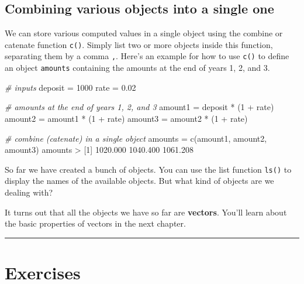 \documentclass[
]{book}
\newenvironment{Shaded}{\begin{snugshade}}{\end{snugshade}}
\newcommand{\CommentTok}[1]{\textcolor[rgb]{0.56,0.35,0.01}{\textit{#1}}}
\newcommand{\DecValTok}[1]{\textcolor[rgb]{0.00,0.00,0.81}{#1}}
\newcommand{\FloatTok}[1]{\textcolor[rgb]{0.00,0.00,0.81}{#1}}
\newcommand{\FunctionTok}[1]{\textcolor[rgb]{0.00,0.00,0.00}{#1}}
\newcommand{\NormalTok}[1]{#1}
\newcommand{\OtherTok}[1]{\textcolor[rgb]{0.56,0.35,0.01}{#1}}
\newcommand{\SpecialCharTok}[1]{\textcolor[rgb]{0.00,0.00,0.00}{#1}}
\begin{document}
\hypertarget{combining-various-objects-into-a-single-one}{%
\subsection{Combining various objects into a single one}\label{combining-various-objects-into-a-single-one}}

We can store various computed values in a single object using the combine or
catenate function \texttt{c()}. Simply list two or more objects inside this function,
separating them by a comma \texttt{,}. Here's an example for how to use \texttt{c()} to
define an object \texttt{amounts} containing the amounts at the end of years 1, 2,
and 3.

\begin{Shaded}
\begin{Highlighting}[]
\CommentTok{\# inputs}
\NormalTok{deposit }\OtherTok{=} \DecValTok{1000}
\NormalTok{rate }\OtherTok{=} \FloatTok{0.02}

\CommentTok{\# amounts at the end of years 1, 2, and 3}
\NormalTok{amount1 }\OtherTok{=}\NormalTok{ deposit }\SpecialCharTok{*}\NormalTok{ (}\DecValTok{1} \SpecialCharTok{+}\NormalTok{ rate)}
\NormalTok{amount2 }\OtherTok{=}\NormalTok{ amount1 }\SpecialCharTok{*}\NormalTok{ (}\DecValTok{1} \SpecialCharTok{+}\NormalTok{ rate)}
\NormalTok{amount3 }\OtherTok{=}\NormalTok{ amount2 }\SpecialCharTok{*}\NormalTok{ (}\DecValTok{1} \SpecialCharTok{+}\NormalTok{ rate)}

\CommentTok{\# combine (catenate) in a single object}
\NormalTok{amounts }\OtherTok{=} \FunctionTok{c}\NormalTok{(amount1, amount2, amount3)}
\NormalTok{amounts}
\SpecialCharTok{\textgreater{}}\NormalTok{ [}\DecValTok{1}\NormalTok{] }\FloatTok{1020.000} \FloatTok{1040.400} \FloatTok{1061.208}
\end{Highlighting}
\end{Shaded}

So far we have created a bunch of objects. You can use the list function \texttt{ls()}
to display the names of the available objects. But what kind of objects are we
dealing with?

It turns out that all the objects we have so far are \textbf{vectors}. You'll
learn about the basic properties of vectors in the next chapter.

\begin{center}\rule{0.5\linewidth}{0.5pt}\end{center}

\hypertarget{exercises}{%
\section{Exercises}\label{exercises}}
\end{document}
